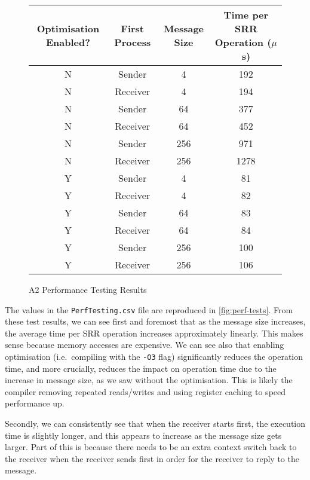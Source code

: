 \documentclass[12pt, titlepage]{article}
\begin{document}
    \begin{figure}[h]
    \begin{center}
    \begin{tabular}{|c|c|c|c|}
        \hline
        Optimisation Enabled? & First Process & Message Size & Time per SRR Operation ($\mu$s) \\
        \hline
        \hline
        N & Sender & 4 & 192 \\
        N & Receiver & 4 & 194 \\
        N & Sender & 64 & 377 \\
        N & Receiver & 64 & 452 \\
        N & Sender & 256 & 971 \\
        N & Receiver & 256 & 1278 \\
        Y & Sender & 4 & 81 \\
        Y & Receiver & 4 & 82 \\
        Y & Sender & 64 & 83 \\
        Y & Receiver & 64 & 84 \\
        Y & Sender & 256 & 100 \\
        Y & Receiver & 256 & 106 \\
        \hline
    \end{tabular}
    \end{center}
    \caption{A2 Performance Testing Results}
    \label{fig:perf-tests}
    \end{figure}

    The values in the \verb`PerfTesting.csv` file are reproduced in \autoref{fig:perf-tests}. From these test results, we can see first and foremost that as the message size increases, the average time per SRR operation increases approximately linearly. This makes sense because memory accesses are expensive. We can see also that enabling optimisation (i.e.\ compiling with the \verb`-O3` flag) significantly reduces the operation time, and more crucially, reduces the impact on operation time due to the increase in message size, as we saw without the optimisation. This is likely the compiler removing repeated reads/writes and using register caching to speed performance up.

    Secondly, we can consistently see that when the receiver starts first, the execution time is slightly longer, and this appears to increase as the message size gets larger. Part of this is because there needs to be an extra context switch back to the receiver when the receiver sends first in order for the receiver to reply to the message.
\end{document}
